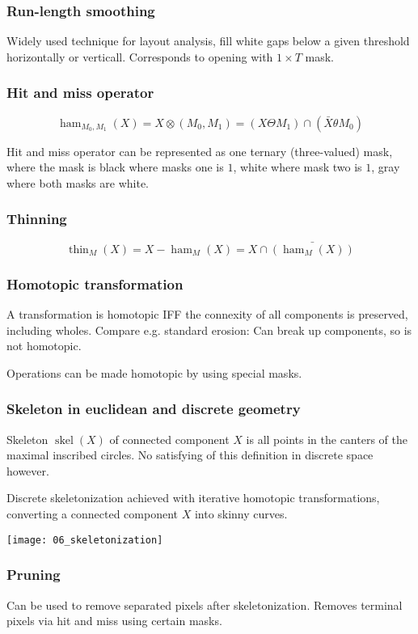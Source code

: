 \subsubsection{Run-length smoothing}

Widely used technique for layout analysis, fill white gaps below a given
threshold horizontally or verticall. Corresponds to opening with $1 \times T$
mask.

\subsubsection{Hit and miss operator}

\[
		\operatorname{ham}_{M_0, M_1}(X) = X \otimes (M_0, M_1) = (X \Theta M_1) \cap (\bar{X} \theta M_0)
\]

Hit and miss operator can be represented as one ternary (three-valued) mask,
where the mask is black where masks one is $1$, white where mask two is $1$,
gray where both masks are white.

\subsubsection{Thinning}

\[
		\operatorname{thin}_M(X) = X - \operatorname{ham}_M(X) = X \cap \bar{(\operatorname{ham}_M(X))}
\]

\subsubsection{Homotopic transformation}

A transformation is homotopic IFF the connexity of all components is preserved,
including wholes. Compare e.g. standard erosion: Can break up components, so is
not homotopic.

Operations can be made homotopic by using special masks.

\subsubsection{Skeleton in euclidean and discrete geometry}

Skeleton $\operatorname{skel}(X)$ of connected component $X$ is all points in
the canters of the maximal inscribed circles. No satisfying of this definition
in discrete space however.

Discrete skeletonization achieved with iterative homotopic transformations,
converting a connected component $X$ into skinny curves.

\texttt{[image: 06\_skeletonization]}

\subsubsection{Pruning}

Can be used to remove separated pixels after skeletonization. Removes terminal
pixels via hit and miss using certain masks.
